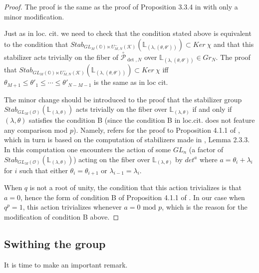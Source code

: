\documentclass[12pt]{amsart}
\numberwithin{equation}{section}
\numberwithin{equation}{section}
\theoremstyle{definition}
\begin{document}
\begin{proof}
    The proof is the same as the proof of Proposition 3.3.4 in \cite{ty} with only a minor modification. 

    Just as in loc. cit. we need to check that the condition stated above is equivalent to the condition that $Stab_{GL_M(\mathbb{O})\ltimes U^-_{M,N}(\mathcal{K})}(\mathbb{L}_{(\lambda,(\theta,\theta'))})\subset Ker\ \chi$ and that this stabilizer acts trivially on the fiber of $\overset{\circ}{\mathcal{P}}_{\det, N}$ over $\mathbb{L}_{(\lambda,(\theta,\theta'))}\in Gr_N$. The proof that $Stab_{GL_M(\mathbb{O})\ltimes U^-_{M,N}(\mathcal{K})}(\mathbb{L}_{(\lambda,(\theta,\theta'))})\subset Ker\ \chi$ iff $\theta_{M+1}\leq \theta'_1\leq\cdots\leq \theta'_{N-M-1}$ is the same as in loc cit. 

    The minor change should be introduced to the proof that the stabilizer group $Stab_{GL_M(\mathcal{O})}(\mathbb{L}_{(\lambda,\theta)})$ acts trivially on the fiber over $\mathbb{L}_{(\lambda,\theta)}$ if and only if $(\lambda,\theta)$ satisfies the condition B (since the condition B in loc.cit. does not feature any comparison mod $p$). Namely, \cite{ty} refers for the proof to  Proposition 4.1.1 of \cite{bft1}, which in turn is based on the computation of stabilizers made in \cite{bft2}, Lemma 2.3.3. In this computation one encounters the action of some $GL_n$ (a factor of $Stab_{GL_M(\mathcal{O})}(\mathbb{L}_{(\lambda,\theta)})$) acting on  the fiber over $\mathbb{L}_{(\lambda,\theta)}$ by $det^a$ where $a=\theta_i+\lambda_i$ for $i$ such that either $\theta_i=\theta_{i+1}$ or $\lambda_{i-1}=\lambda_i$. 
    
    When $q$ is not a root of unity, the condition that this action trivializes is that $a=0$, hence the form of condition B of Proposition 4.1.1 of \cite{ty}. In our case when $q^p=1$, this action trivializes whenever $a=0 \text{ mod }p$, which is the reason for the modification of condition B above.
\end{proof}

\subsection{Swithing the group}
It is time to make an important remark.
\end{document}
